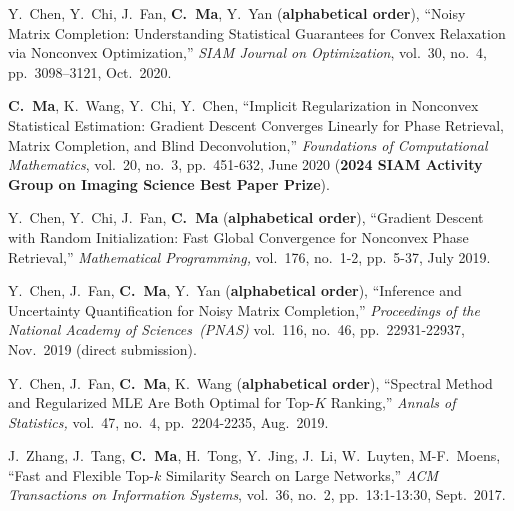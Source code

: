 \documentclass[a4paper, 10pt]{article}
\newenvironment{changemargin}[2]{%
  \begin{list}{}{%
    \setlength{\topsep}{0pt}%
    \setlength{\leftmargin}{#1}%
    \setlength{\rightmargin}{#2}%
    \setlength{\listparindent}{\parindent}%
    \setlength{\itemindent}{\parindent}%
    \setlength{\parsep}{\parskip}%
  }%
  \item[]}{\end{list}
}
\newenvironment{body} {
	\vspace*{-16pt}
	\begin{changemargin}{-0.3in}{-0.5in}
  }	
	{\end{changemargin}
}
\begin{document}
\begin{body}
\begin{enumerate}[label={[{J}{{\arabic*}}]}]
\item Y.~Chen, Y.~Chi, J.~Fan, \textbf{C.~Ma}, Y.~Yan (\textbf{alphabetical order}), {``Noisy Matrix Completion: Understanding Statistical Guarantees for Convex Relaxation via Nonconvex Optimization,''} \emph{SIAM Journal on Optimization}, vol.~30, no.~4, pp.~3098–3121, Oct.~2020. \\

\item \textbf{C.~Ma}, K.~Wang, Y.~Chi, Y.~Chen, {{``Implicit Regularization in Nonconvex Statistical Estimation: Gradient Descent Converges Linearly for Phase Retrieval, Matrix Completion, and Blind Deconvolution,''}}  \emph{Foundations of Computational Mathematics}, vol.~20, no.~3, pp.~451-632, June
2020  (\textbf{2024 SIAM Activity Group on Imaging Science Best Paper Prize}). \\


\item Y.~Chen, Y.~Chi, J.~Fan, \textbf{C.~Ma} (\textbf{alphabetical order}), {``Gradient Descent with Random Initialization: Fast Global Convergence for Nonconvex Phase Retrieval,''} \emph{Mathematical Programming,} vol.~176, no.~1-2, pp.~5-37, July 2019. \\


\item Y.~Chen, J.~Fan, \textbf{C.~Ma}, Y.~Yan (\textbf{alphabetical order}), {``Inference and Uncertainty Quantification for Noisy Matrix Completion,''} \emph{Proceedings of the National Academy of Sciences~(PNAS)} vol.~116, no.~46, pp.~22931-22937, Nov.~2019 (direct submission). \\




	
\item 
	Y.~Chen, J.~Fan, \textbf{C.~Ma}, K.~Wang (\textbf{alphabetical order}), {{``Spectral Method and Regularized MLE Are Both Optimal for Top-$K$ Ranking,''}} \emph{Annals of Statistics,} vol.~47, no.~4, pp.~2204-2235, Aug.~2019. \\







	
	\item J.~Zhang, J.~Tang, \textbf{C.~Ma}, H.~Tong, Y.~Jing, J.~Li, W.~Luyten, M-F.~Moens, {{``Fast and Flexible Top-$k$ Similarity Search on Large Networks,''}} \emph{ACM Transactions on Information Systems}, vol.~36, no.~2,  pp.~13:1-13:30, Sept.~2017.\\
	
\end{enumerate}
\end{body}
\end{document}
